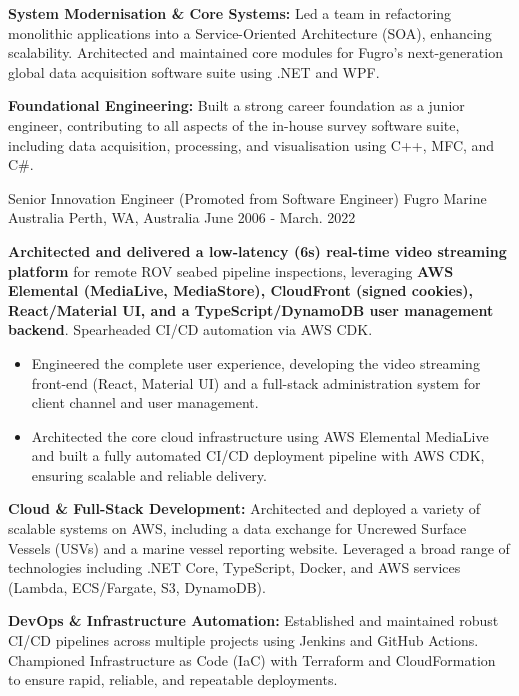 \begin{cventries}
{\begin{cvitems}
        \item {\textbf{System Modernisation \& Core Systems:} Led a team in refactoring monolithic applications into a Service-Oriented Architecture (SOA), enhancing scalability. Architected and maintained core modules for Fugro's next-generation global data acquisition software suite using .NET and WPF.}
        \item {\textbf{Foundational Engineering:} Built a strong career foundation as a junior engineer, contributing to all aspects of the in-house survey software suite, including data acquisition, processing, and visualisation using C++, MFC, and C\#.}
      \end{cvitems}
    }
  \cventry
    {Senior Innovation Engineer (Promoted from Software Engineer)} %
    {Fugro Marine Australia} %
    {Perth, WA, Australia} %
    {June 2006 - March. 2022} %
    {
      \begin{cvitems} %
        \item {\textbf{Architected and delivered a low-latency (6s) real-time video streaming platform} for remote ROV seabed pipeline inspections, leveraging \textbf{AWS Elemental (MediaLive, MediaStore), CloudFront (signed cookies), React/Material UI, and a TypeScript/DynamoDB user management backend}. Spearheaded CI/CD automation via AWS CDK.}
          \begin{itemize}
            \item {Engineered the complete user experience, developing the video streaming front-end (React, Material UI) and a full-stack administration system for client channel and user management.}
            \item {Architected the core cloud infrastructure using AWS Elemental MediaLive and built a fully automated CI/CD deployment pipeline with AWS CDK, ensuring scalable and reliable delivery.}
          \end{itemize}
        \item {\textbf{Cloud \& Full-Stack Development:} Architected and deployed a variety of scalable systems on AWS, including a data exchange for Uncrewed Surface Vessels (USVs) and a marine vessel reporting website. Leveraged a broad range of technologies including .NET Core, TypeScript, Docker, and AWS services (Lambda, ECS/Fargate, S3, DynamoDB).}
        \item {\textbf{DevOps \& Infrastructure Automation:} Established and maintained robust CI/CD pipelines across multiple projects using Jenkins and GitHub Actions. Championed Infrastructure as Code (IaC) with Terraform and CloudFormation to ensure rapid, reliable, and repeatable deployments.}

\end{cvitems}}
\end{cventries}
